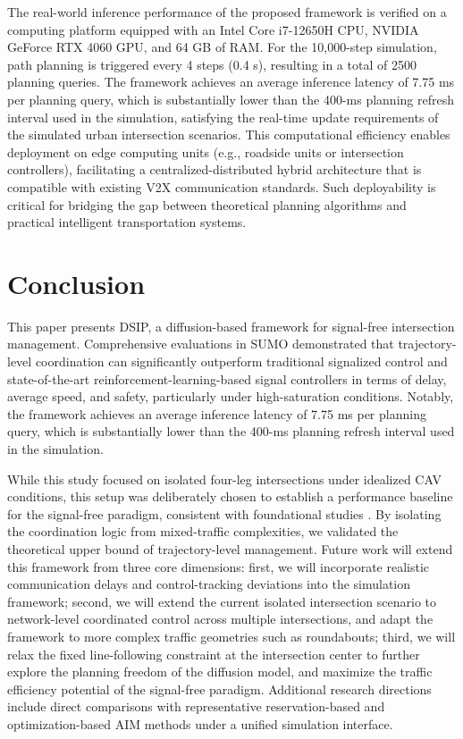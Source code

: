 \documentclass[journal]{IEEEtran}
\begin{document}
The real-world inference performance of the proposed framework is verified on a computing platform equipped with an Intel Core i7-12650H CPU, NVIDIA GeForce RTX 4060 GPU, and 64 GB of RAM. For the 10,000-step simulation, path planning is triggered every 4 steps (0.4 s), resulting in a total of 2500 planning queries. The framework achieves an average inference latency of 7.75 ms per planning query, which is substantially lower than the 400-ms planning refresh interval used in the simulation, satisfying the real-time update requirements of the simulated urban intersection scenarios. This computational efficiency enables deployment on edge computing units (e.g., roadside units or intersection controllers), facilitating a centralized-distributed hybrid architecture that is compatible with existing V2X communication standards. Such deployability is critical for bridging the gap between theoretical planning algorithms and practical intelligent transportation systems.


\section{Conclusion}

This paper presents DSIP, a diffusion-based framework for signal-free intersection management. Comprehensive evaluations in SUMO demonstrated that trajectory-level coordination can significantly outperform traditional signalized control and state-of-the-art reinforcement-learning-based signal controllers in terms of delay, average speed, and safety, particularly under high-saturation conditions. Notably, the framework achieves an average inference latency of 7.75 ms per planning query, which is substantially lower than the 400-ms planning refresh interval used in the simulation. 

While this study focused on isolated four-leg intersections under idealized CAV conditions, this setup was deliberately chosen to establish a performance baseline for the signal-free paradigm, consistent with foundational studies \cite{dresner2004}. By isolating the coordination logic from mixed-traffic complexities, we validated the theoretical upper bound of trajectory-level management. Future work will extend this framework from three core dimensions: first, we will incorporate realistic communication delays and control-tracking deviations into the simulation framework; second, we will extend the current isolated intersection scenario to network-level coordinated control across multiple intersections, and adapt the framework to more complex traffic geometries such as roundabouts; third, we will relax the fixed line-following constraint at the intersection center to further explore the planning freedom of the diffusion model, and maximize the traffic efficiency potential of the signal-free paradigm. Additional research directions include direct comparisons with representative reservation-based and optimization-based AIM methods under a unified simulation interface.
\end{document}
